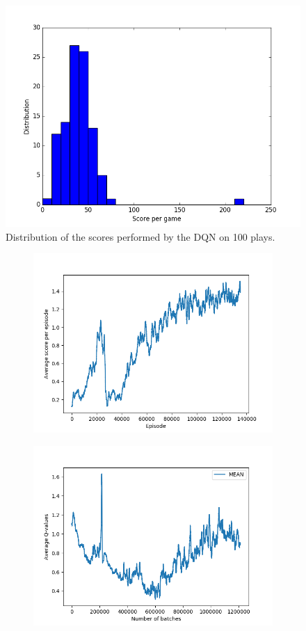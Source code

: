 \documentclass[letterpaper]{article}
\begin{document}
\begin{figure}[!h]
	\includegraphics[width=.5\textwidth]{figures/dqn_uniform_score_distribution}
	\caption{Distribution of the scores performed by the DQN on 100 plays.\label{fig:dqn uniform scores dist}}
\end{figure}

\begin{figure}[!t]
	\vspace{-1.5cm}
	\begin{subfigure}{.47\textwidth}
		\includegraphics[width=\textwidth]{figures/ddqn_uniform_e_scores}
	\end{subfigure}
	\hfill
	\begin{subfigure}{.47\textwidth}
		\includegraphics[width=\textwidth]{figures/ddqn_uniform_q_values}

\end{subfigure}
\end{figure}
\end{document}

